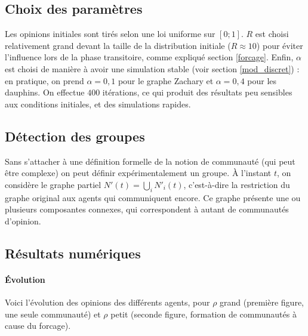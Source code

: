 \documentclass[12pt]{article}
\begin{document}
\subsection{Choix des paramètres}
Les opinions initiales sont tirés selon une loi uniforme sur $[0; 1]$.
$R$ est choisi relativement grand devant la taille de la distribution
initiale ($R\approx10$) pour éviter l'influence lors de la phase
transitoire, comme expliqué section \ref{forcage}. Enfin, $\alpha$ est
choisi de manière à avoir une simulation stable (voir section
\ref{mod_discret}) : en pratique, on prend $\alpha = 0,1$ pour le
graphe Zachary et $\alpha = 0,4$ pour les dauphins. On effectue $400$
itérations, ce qui produit des résultats peu sensibles aux conditions
initiales, et des simulations rapides.

\subsection{Détection des groupes}
Sans s'attacher à une définition formelle de la notion de communauté
(qui peut être complexe) on peut définir expérimentalement un
groupe. À l'instant $t$, on considère le graphe partiel $N'(t) =
\bigcup_i N'_i(t)$, c'est-à-dire la restriction du graphe original aux
agents qui communiquent encore. Ce graphe présente une ou plusieurs
composantes connexes, qui correspondent à autant de communautés
d'opinion.

\subsection{Résultats numériques}
\paragraph{Évolution}

Voici l'évolution des opinions des différents agents, pour $\rho$
grand (première figure, une seule communauté) et $\rho$ petit (seconde
figure, formation de communautés à cause du forcage).
\end{document}
